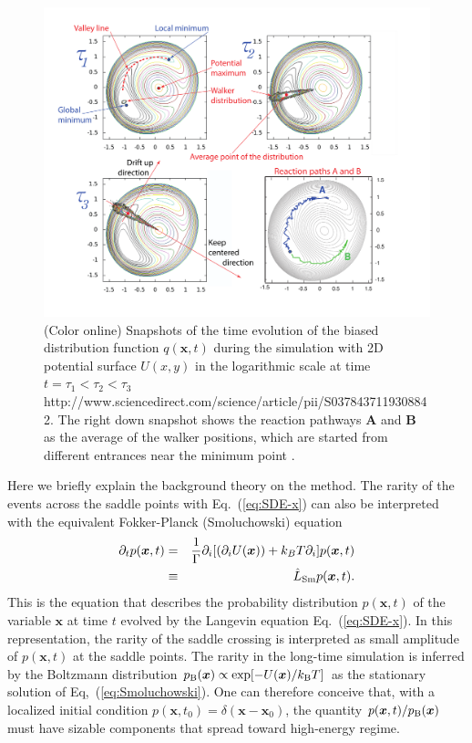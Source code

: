 \documentclass[preprint,12pt]{elsarticle}
\begin{document}
\begin{figure}[!t]
 \begin{center}
 \includegraphics[scale=0.36]{valleytrack.pdf}
  \caption{(Color online)   Snapshots of the time evolution of the biased distribution function $q({\bm x},t)$ during the simulation with 2D potential surface $U(x,y)$ 
    in the logarithmic scale at time $t=\tau_1 < \tau_2 < \tau_3 $ http://www.sciencedirect.com/science/article/pii/S0378437119308842.  The right down snapshot shows the reaction pathways {\bf A} and {\bf B} as the average of the walker positions, which are started from different entrances near the minimum point \cite{Akashi}. }
  \label{fig:valleytrack}
 \end{center}
\end{figure}



Here we briefly explain the background theory on the method. The rarity of the events across the saddle points with Eq.~(\ref{eq:SDE-x}) can also be interpreted with the equivalent Fokker-Planck (Smoluchowski) equation~\cite{Gardiner-book}
\begin{eqnarray}
\partial_t p({\bm x},t) &=& \frac{1}{\Gamma}\partial_i [ (\partial_{i}U({\bm x})) + k_{B}T \partial_i]p({\bm x},t)
\\
&\equiv& \hat{L}_{\rm Sm}p({\bm x},t)
.
\label{eq:Smoluchowski}
\end{eqnarray}
This is the equation that describes the probability distribution $p({\bm x},t)$ of the variable ${\bm x}$ at time $t$ evolved by the Langevin equation Eq.~(\ref{eq:SDE-x}). In this representation, the rarity of the saddle crossing is interpreted as small amplitude of $p({\bm x}, t)$ at the saddle points. The rarity in the long-time simulation is inferred by the Boltzmann distribution $p_{\rm B}({\bm x})\propto {\rm exp}[-U({\bm x})/k_{\rm B}T]$ as the stationary solution of Eq,~(\ref{eq:Smoluchowski}). One can therefore conceive that, with a localized initial condition $p({\bm x}, t_{0})=\delta({\bm x}-{\bm x}_{0})$, the quantity $p({\bm x},t)/p_{\rm B}({\bm x})$ must have sizable components that spread toward high-energy regime. 
\end{document}
